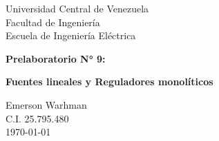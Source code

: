 \begin{titlepage}
    \centering
    \Large
    Universidad Central de Venezuela\\
    Facultad de Ingeniería\\
    Escuela de Ingeniería Eléctrica
    \vspace*{8cm}

    \Huge
    \textbf{Prelaboratorio N° 9: } 

    \textbf{Fuentes lineales y Reguladores monolíticos}
    \vfill


    \Large

    Emerson Warhman \\
    C.I. 25.795.480 \\
    \today

\end{titlepage}